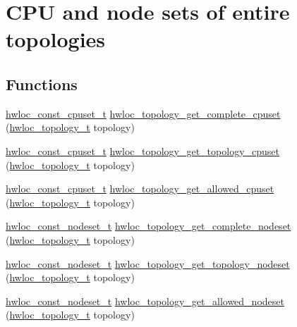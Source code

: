 \hypertarget{a00202}{}\section{C\+PU and node sets of entire topologies}
\label{a00202}
\subsection*{Functions}
\begin{DoxyCompactItemize}
\item 
\hyperlink{a00183_ga1f784433e9b606261f62d1134f6a3b25}{hwloc\+\_\+const\+\_\+cpuset\+\_\+t} \hyperlink{a00202_gaee30e03391c1ed7dfd617fb5c7bbb033}{hwloc\+\_\+topology\+\_\+get\+\_\+complete\+\_\+cpuset} (\hyperlink{a00186_ga9d1e76ee15a7dee158b786c30b6a6e38}{hwloc\+\_\+topology\+\_\+t} topology)
\item 
\hyperlink{a00183_ga1f784433e9b606261f62d1134f6a3b25}{hwloc\+\_\+const\+\_\+cpuset\+\_\+t} \hyperlink{a00202_ga79212faa07b70dd26588941b17d9fa82}{hwloc\+\_\+topology\+\_\+get\+\_\+topology\+\_\+cpuset} (\hyperlink{a00186_ga9d1e76ee15a7dee158b786c30b6a6e38}{hwloc\+\_\+topology\+\_\+t} topology)
\item 
\hyperlink{a00183_ga1f784433e9b606261f62d1134f6a3b25}{hwloc\+\_\+const\+\_\+cpuset\+\_\+t} \hyperlink{a00202_ga517d5d68ec9f24583d8933aab713be8e}{hwloc\+\_\+topology\+\_\+get\+\_\+allowed\+\_\+cpuset} (\hyperlink{a00186_ga9d1e76ee15a7dee158b786c30b6a6e38}{hwloc\+\_\+topology\+\_\+t} topology)
\item 
\hyperlink{a00183_ga2f5276235841ad66a79bedad16a5a10c}{hwloc\+\_\+const\+\_\+nodeset\+\_\+t} \hyperlink{a00202_ga773fd98949461ef4c1e3170bb0c0418f}{hwloc\+\_\+topology\+\_\+get\+\_\+complete\+\_\+nodeset} (\hyperlink{a00186_ga9d1e76ee15a7dee158b786c30b6a6e38}{hwloc\+\_\+topology\+\_\+t} topology)
\item 
\hyperlink{a00183_ga2f5276235841ad66a79bedad16a5a10c}{hwloc\+\_\+const\+\_\+nodeset\+\_\+t} \hyperlink{a00202_ga3fd37303e99ace8b0d0ea03f95f8c514}{hwloc\+\_\+topology\+\_\+get\+\_\+topology\+\_\+nodeset} (\hyperlink{a00186_ga9d1e76ee15a7dee158b786c30b6a6e38}{hwloc\+\_\+topology\+\_\+t} topology)
\item 
\hyperlink{a00183_ga2f5276235841ad66a79bedad16a5a10c}{hwloc\+\_\+const\+\_\+nodeset\+\_\+t} \hyperlink{a00202_ga21a4d7237a11e76b912ed4524ab78cbd}{hwloc\+\_\+topology\+\_\+get\+\_\+allowed\+\_\+nodeset} (\hyperlink{a00186_ga9d1e76ee15a7dee158b786c30b6a6e38}{hwloc\+\_\+topology\+\_\+t} topology)
\end{DoxyCompactItemize}


